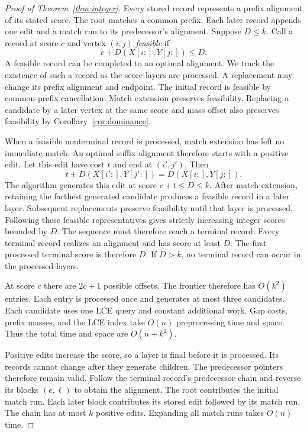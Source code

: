\documentclass[11pt]{article}
\theoremstyle{remark}
\begin{document}
\begin{proof}[Proof of Theorem~\ref{thm:integer}]
Every stored record represents a prefix alignment of its stated score.
The root matches a common prefix. Each later record appends one edit
and a match run to its predecessor's alignment.
Suppose $D\le k$. Call a record at
score $c$ and vertex $(i,j)$ \emph{feasible} if
\[
 c+D(X[i:],Y[j:])\le D.
\]
A feasible record can be completed to an optimal alignment.
We track the existence of such a record as the score layers are
processed. A replacement may change its prefix alignment and endpoint.
The initial record is feasible by common-prefix cancellation.
Match extension preserves feasibility. Replacing a candidate by a later
vertex at the same score and mass offset also preserves feasibility
by Corollary~\ref{cor:dominance}.

When a feasible nonterminal record is processed, match extension has
left no immediate match.
An optimal suffix alignment therefore starts with a positive edit.
Let this edit have cost $t$ and end at $(i',j')$.
Then
\[
 t+D(X[i':],Y[j':])=D(X[i:],Y[j:]).
\]
The algorithm generates this edit at score $c+t\le D\le k$.
After match extension, retaining the farthest generated candidate
produces a feasible record in a later layer.
Subsequent replacements preserve feasibility until that layer is
processed. Following these feasible representatives gives strictly
increasing integer scores bounded by $D$. The sequence must therefore
reach a terminal record. Every terminal record realizes an alignment
and has score at least $D$. The first processed terminal score is
therefore $D$.
If $D>k$, no terminal record can occur in the processed layers.

At score $c$ there are $2c+1$ possible offsets.
The frontier therefore has $O(k^2)$ entries.
Each entry is processed once and generates at most
three candidates. Each candidate uses one LCE query and constant
additional work. Gap costs, prefix masses, and the LCE index take
$O(n)$ preprocessing time and space. Thus the total time and space
are $O(n+k^2)$.

Positive edits increase the score, so a layer is final before it is
processed. Its records cannot change after they generate children.
The predecessor pointers therefore remain valid.
Follow the terminal record's predecessor chain and reverse its blocks
$(e,\ell)$ to obtain the alignment. The root contributes the initial
match run. Each later block contributes its stored edit followed by its
match run. The chain has at most $k$ positive edits.
Expanding all match runs takes $O(n)$ time.
\end{proof}
\end{document}
